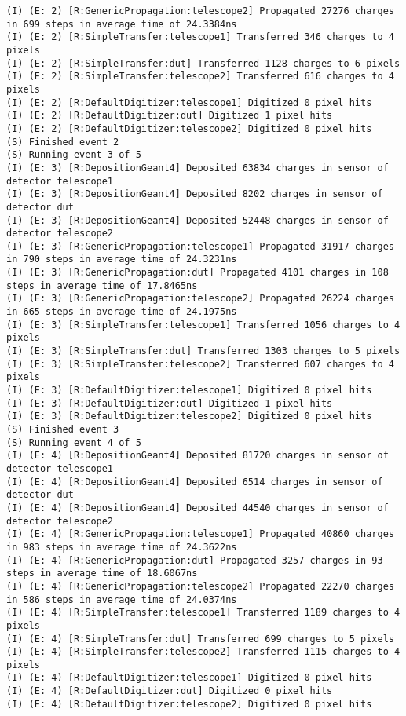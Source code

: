 \begin{lstlisting}[breaklines]
(I) (E: 2) [R:GenericPropagation:telescope2] Propagated 27276 charges in 699 steps in average time of 24.3384ns
(I) (E: 2) [R:SimpleTransfer:telescope1] Transferred 346 charges to 4 pixels
(I) (E: 2) [R:SimpleTransfer:dut] Transferred 1128 charges to 6 pixels
(I) (E: 2) [R:SimpleTransfer:telescope2] Transferred 616 charges to 4 pixels
(I) (E: 2) [R:DefaultDigitizer:telescope1] Digitized 0 pixel hits
(I) (E: 2) [R:DefaultDigitizer:dut] Digitized 1 pixel hits
(I) (E: 2) [R:DefaultDigitizer:telescope2] Digitized 0 pixel hits
(S) Finished event 2
(S) Running event 3 of 5
(I) (E: 3) [R:DepositionGeant4] Deposited 63834 charges in sensor of detector telescope1
(I) (E: 3) [R:DepositionGeant4] Deposited 8202 charges in sensor of detector dut
(I) (E: 3) [R:DepositionGeant4] Deposited 52448 charges in sensor of detector telescope2
(I) (E: 3) [R:GenericPropagation:telescope1] Propagated 31917 charges in 790 steps in average time of 24.3231ns
(I) (E: 3) [R:GenericPropagation:dut] Propagated 4101 charges in 108 steps in average time of 17.8465ns
(I) (E: 3) [R:GenericPropagation:telescope2] Propagated 26224 charges in 665 steps in average time of 24.1975ns
(I) (E: 3) [R:SimpleTransfer:telescope1] Transferred 1056 charges to 4 pixels
(I) (E: 3) [R:SimpleTransfer:dut] Transferred 1303 charges to 5 pixels
(I) (E: 3) [R:SimpleTransfer:telescope2] Transferred 607 charges to 4 pixels
(I) (E: 3) [R:DefaultDigitizer:telescope1] Digitized 0 pixel hits
(I) (E: 3) [R:DefaultDigitizer:dut] Digitized 1 pixel hits
(I) (E: 3) [R:DefaultDigitizer:telescope2] Digitized 0 pixel hits
(S) Finished event 3
(S) Running event 4 of 5
(I) (E: 4) [R:DepositionGeant4] Deposited 81720 charges in sensor of detector telescope1
(I) (E: 4) [R:DepositionGeant4] Deposited 6514 charges in sensor of detector dut
(I) (E: 4) [R:DepositionGeant4] Deposited 44540 charges in sensor of detector telescope2
(I) (E: 4) [R:GenericPropagation:telescope1] Propagated 40860 charges in 983 steps in average time of 24.3622ns
(I) (E: 4) [R:GenericPropagation:dut] Propagated 3257 charges in 93 steps in average time of 18.6067ns
(I) (E: 4) [R:GenericPropagation:telescope2] Propagated 22270 charges in 586 steps in average time of 24.0374ns
(I) (E: 4) [R:SimpleTransfer:telescope1] Transferred 1189 charges to 4 pixels
(I) (E: 4) [R:SimpleTransfer:dut] Transferred 699 charges to 5 pixels
(I) (E: 4) [R:SimpleTransfer:telescope2] Transferred 1115 charges to 4 pixels
(I) (E: 4) [R:DefaultDigitizer:telescope1] Digitized 0 pixel hits
(I) (E: 4) [R:DefaultDigitizer:dut] Digitized 0 pixel hits
(I) (E: 4) [R:DefaultDigitizer:telescope2] Digitized 0 pixel hits

\end{lstlisting}
